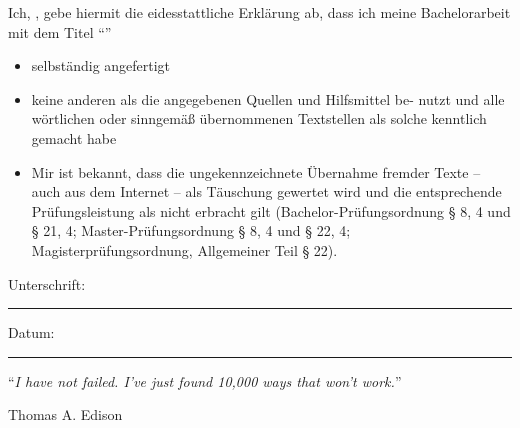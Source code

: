 \documentclass[
captions=nooneline,
11pt, %
ngerman, %
singlespacing, %
headsepline, %
]{MastersDoctoralThesis} %
\begin{document}

\begin{declaration}
\addchaptertocentry{\authorshipname}

\noindent Ich, \authorname, gebe hiermit die eidesstattliche Erklärung ab, dass ich meine Bachelorarbeit mit dem Titel \enquote{\ttitle}

\begin{itemize}
\item selbständig angefertigt
\item keine anderen als die angegebenen Quellen und Hilfsmittel be- nutzt und alle wörtlichen oder sinngemäß übernommenen Textstellen als solche kenntlich gemacht habe
\item Mir ist bekannt, dass die ungekennzeichnete Übernahme fremder Texte – auch aus dem Internet – als Täuschung gewertet wird und die entsprechende Prüfungsleistung als nicht erbracht gilt (Bachelor-Prüfungsordnung § 8, 4 und § 21, 4; Master-Prüfungsordnung § 8, 4 und § 22, 4; Magisterprüfungsordnung, Allgemeiner Teil § 22).\\
\end{itemize}

\noindent Unterschrift:\\
\rule[0.5em]{25em}{0.5pt} %

\noindent Datum:\\
\rule[0.5em]{25em}{0.5pt} %
\end{declaration}

\cleardoublepage


\vspace*{0.2\textheight}

\noindent\enquote{\itshape I have not failed. I've just found 10,000 ways that won't work.}\bigbreak

\hfill Thomas A. Edison

\end{document}
